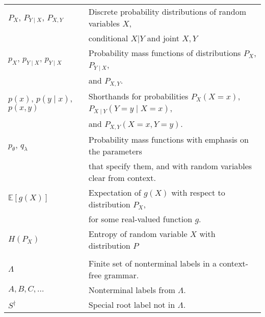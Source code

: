 \documentclass[11pt]{article}
\begin{document}
\begin{table}[h]
\begin{tabular}{l|l}
    $P_X$, $P_{Y \mid X}$, $P_{X, Y}$ & Discrete probability distributions of random variables $X$, \\ & conditional $X \vert Y$ and joint $X, Y$ \\

    $p_{X}$, $p_{Y \mid X}$, $p_{Y \mid X}$ & Probability mass functions of distributions $P_X$, $P_{Y \mid X}$, \\ & and $P_{X, Y}$. \\

    $p(x)$, $p(y \mid x)$, $p(x, y)$ & Shorthands for probabilities $P_{X}(X = x)$, $P_{X \mid Y}(Y = y \mid X = x)$, \\ & and $P_{X, Y}(X = x, Y = y)$. \\

    $p_{\theta}$, $q_{\lambda}$ & Probability mass functions with emphasis on the parameters \\ & that specify them, and with random variables clear from context.  \\

    $\mathbb{E}[g(X)]$ & Expectation of $g(X)$ with respect to distribution $P_X$, \\ & for some real-valued function $g$. \\

    $H(P_X)$ & Entropy of random variable $X$ with distribution $P$ \\
    & \\


    $\Lambda$ & Finite set of nonterminal labels in a context-free grammar.  \\
    $A, B, C, \dots$ & Nonterminal labels from $\Lambda$.  \\
    $S^{\dagger}$ & Special root label not in $\Lambda$.  \\



    \hline\hline
  \end{tabular}

\end{table}
\end{document}
